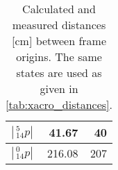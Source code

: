 \begin{table}[htbp]
{\begin{tabular}{l r r}
$|\,^5_{14} p|$ & 41.67 & 40\\\hline %
$|\,^0_{14} p|$ & 216.08 & 207
\end{tabular}
\label{tab:state7dh}%
}\hfill
\setlength{\tabcolsep}{6pt}
\caption{Calculated and measured distances [cm] between frame origins. The same states are used as given in \autoref{tab:xacro_distances}.}
\label{tab:DH_distances}
\end{table}




